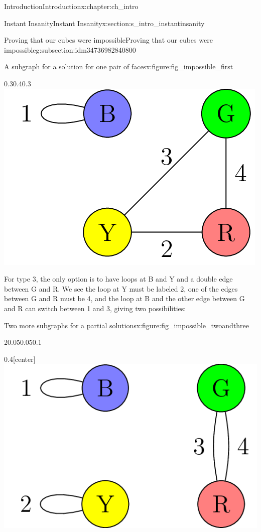 \documentclass[oneside,10pt,]{book}
\numberwithin{equation}{section}
\begin{document}
\begin{chapterptx}{Introduction}{}{Introduction}{}{}{x:chapter:ch_intro}
\begin{sectionptx}{Instant Insanity}{}{Instant Insanity}{}{}{x:section:s_intro_instantinsanity}
\begin{subsectionptx}{Proving that our cubes were impossible}{}{Proving that our cubes were impossible}{}{}{g:subsection:idm34736982840800}
\begin{figureptx}{A subgraph for a solution for one pair of faces}{x:figure:fig_impossible_first}{}
\begin{image}{0.3}{0.4}{0.3}
\includegraphics[width=\linewidth]{images/InstantInsanityImpossibleFirst.png}
\end{image}%
\tcblower
\end{figureptx}%
For type 3, the only option is to have loops at B and Y and a double edge between G and R. We see the loop at Y must be labeled 2, one of the edges between G and R must be 4, and the loop at B and the other edge between G and R can switch between 1 and 3, giving two possibilities:%
\begin{figureptx}{Two more subgraphs for a partial solutions}{x:figure:fig_impossible_twoandthree}{}%
\centering
\begin{sidebyside}{2}{0.05}{0.05}{0.1}%
\begin{sbspanel}{0.4}[center]%
\includegraphics[width=\linewidth]{images/InstantInsanityImpossibleSecond.png}
\end{sbspanel}%

\end{sidebyside}
\end{figureptx}
\end{subsectionptx}
\end{sectionptx}
\end{chapterptx}
\end{document}
